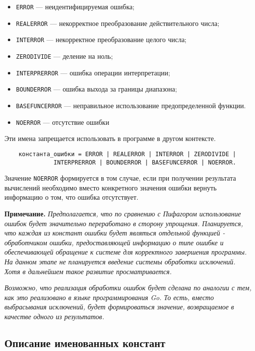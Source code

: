 {\begin{itemize}
	\item \verb|ERROR| --- неидентифицируемая ошибка;
	\item \verb|REALERROR| --- некорректное преобразование действительного числа;
	\item \verb|INTERROR| --- некорректное преобразование целого числа;
	\item \verb|ZERODIVIDE| --- деление на ноль;
	\item \verb|INTERPRERROR| --- ошибка операции интерпретации;
	\item \verb|BOUNDERROR| --- ошибка выхода за границы диапазона;
	\item \verb|BASEFUNCERROR| --- неправильное использование предопределенной функции.
	\item \verb|NOERROR| --- отсутствие ошибки
\end{itemize}

Эти имена запрещается использовать в программе в другом контексте.

\begin{verbatim}
    константа_ошибки = ERROR | REALERROR | INTERROR | ZERODIVIDE |
              INTERPRERROR | BOUNDERROR | BASEFUNCERROR | NOERROR.
\end{verbatim}

Значение \verb|NOERROR| формируется в том случае, если при получении результата вычислений необходимо вместо конкретного значения ошибки вернуть информацию о том, что ошибка отсутствует.

\textbf{Примечание.}
\textit{Предполагается, что по сравнению с Пифагором использование ошибок будет значительно переработано в сторону упрощения. Планируется, что каждая из констант ошибки будет являться отдельной функцией - обработчиком ошибки, предоставляющей информацию о типе ошибке и обеспечивающей обращение к системе для корректного завершения программы. На данном этапе не планируется введение системы обработки исключений. Хотя в дальнейшем такое развитие просматривается.}

\textit{Возможно, что реализация обработки ошибок будет сделана по аналогии с тем, как это реализовано в языке программирования Go. То есть, вместо выбрасывания исключений, будет формироваться значение, возвращаемое в качестве одного из результатов.}

\subsection{Описание именованных констант}

}
